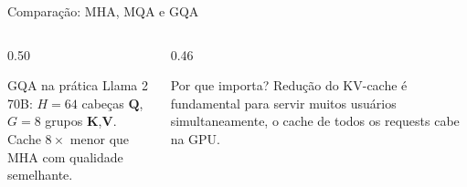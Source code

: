 \documentclass[aspectratio=169, xcolor=dvipsnames]{beamer}
\begin{document}
  \begin{frame}{Comparação: MHA, MQA e GQA}
    \begin{center}
    \end{center}
    \vspace{0.4em}
    \begin{columns}[T]
      \begin{column}{0.50\textwidth}
        \begin{exampleblock}{GQA na prática}
          Llama 2 70B: $H=64$ cabeças $\mathbf{Q}$, $G=8$ grupos $\mathbf{K}$,$\mathbf{V}$.\\
          Cache $8\times$ menor que MHA com qualidade semelhante.
        \end{exampleblock}
      \end{column}
      \begin{column}{0.46\textwidth}
        \begin{alertblock}{Por que importa?}
          Redução do KV-cache é fundamental para servir muitos usuários simultaneamente, o cache de todos os requests cabe na GPU.
        \end{alertblock}
      \end{column}
    \end{columns}
  \end{frame}
\end{document}
